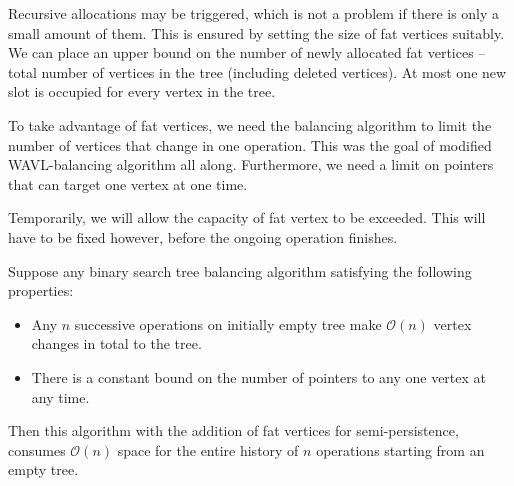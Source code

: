 Recursive allocations may be triggered, which is not a problem if there is only a small amount of them. This is ensured by setting the size of fat vertices suitably. We can place an upper bound on the number of newly allocated fat vertices -- total number of vertices in the tree (including deleted vertices). At most one new slot is occupied for every vertex in the tree.

To take advantage of fat vertices, we need the balancing algorithm to limit the number of vertices that change in one operation. This was the goal of modified WAVL-balancing algorithm all along. Furthermore, we need a limit on pointers that can target one vertex at one time.

Temporarily, we will allow the capacity of fat vertex to be exceeded. This will have to be fixed however, before the ongoing operation finishes.

\begin{prop}
Suppose any binary search tree balancing algorithm satisfying the following properties:
\begin{itemize}
\item 
Any $n$ successive operations on initially empty tree make $\mathcal{O}(n)$ vertex changes in total to the tree. 
\item 
There is a constant bound on the number of pointers to any one vertex at any time.
\end{itemize}
Then this algorithm with the addition of fat vertices for semi-persistence, consumes $\mathcal{O}(n)$ space for the entire history of $n$ operations starting from an empty tree.
\end{prop}

